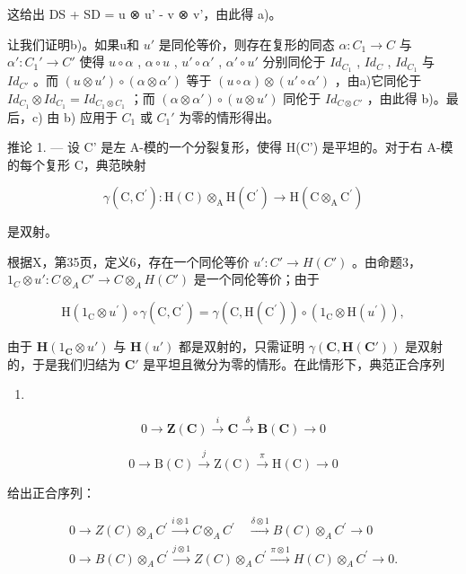 这给出 DS + SD = u ⊗ u' - v ⊗ v'，由此得 a)。

让我们证明b)。如果u和 \(u'\) 是同伦等价，则存在复形的同态 \(\alpha: C_{1} \to C\) 与 \(\alpha': C_{1}' \to C'\) 使得 \(u \circ \alpha\) , \(\alpha \circ u\) , \(u' \circ \alpha'\) , \(\alpha' \circ u'\) 分别同伦于 \(Id_{C_{1}}\) , \(Id_{C}\) , \(Id_{C_{1}}\) 与 \(Id_{C'}\) 。而 \((u \otimes u') \circ (\alpha \otimes \alpha')\) 等于 \((u \circ \alpha) \otimes (u' \circ \alpha')\) ，由a)它同伦于 \(Id_{C_{1}} \otimes Id_{C_{1}} = Id_{C_{1} \otimes C_{1}}\) ；而 \((\alpha \otimes \alpha') \circ (u \otimes u')\) 同伦于 \(Id_{C \otimes C'}\) ，由此得 b)。最后，c) 由 b) 应用于 \(C_{1}\) 或 \(C_{1}'\) 为零的情形得出。

推论 1. --- 设 C' 是左 A-模的一个分裂复形，使得 H(C') 是平坦的。对于右 A-模的每个复形 C，典范映射

\[
\gamma (\mathrm{C}, \mathrm{C} ^ {\prime}): \mathrm{H} (\mathrm{C}) \otimes_ {\mathrm{A}} \mathrm{H} (\mathrm{C} ^ {\prime}) \rightarrow \mathrm{H} (\mathrm{C} \otimes_ {\mathrm{A}} \mathrm{C} ^ {\prime})
\]

是双射。

根据X，第35页，定义6，存在一个同伦等价 \(u': C' \to H(C')\) 。由命题3， \(1_{C} \otimes u': C \otimes_{A} C' \to C \otimes_{A} H(C')\) 是一个同伦等价；由于

\[
\mathrm{H} \left(1 _ {\mathrm{C}} \otimes u ^ {\prime}\right) \circ \gamma (\mathrm{C}, \mathrm{C} ^ {\prime}) = \gamma (\mathrm{C}, \mathrm{H} (\mathrm{C} ^ {\prime})) \circ \left(1 _ {\mathrm{C}} \otimes \mathrm{H} (u ^ {\prime})\right),
\]

由于 \(\mathbf{H}(1_{\mathbf{C}} \otimes u')\) 与 \(\mathbf{H}(u')\) 都是双射的，只需证明 \(\gamma(\mathbf{C}, \mathbf{H}(\mathbf{C}'))\) 是双射的，于是我们归结为 \(\mathbf{C}'\) 是平坦且微分为零的情形。在此情形下，典范正合序列

\begin{enumerate}
\def\labelenumi{(\Roman{enumi})}
\tightlist
\item
\end{enumerate}

\[
0 \to \mathbf {Z} (\mathbf {C}) \xrightarrow {i} \mathbf {C} \xrightarrow {\delta} \mathbf {B} (\mathbf {C}) \to 0\tag{II}
\]

\[
0 \rightarrow \mathrm{B} (\mathrm{C}) \xrightarrow {j} \mathrm{Z} (\mathrm{C}) \xrightarrow {\pi} \mathrm{H} (\mathrm{C}) \rightarrow 0
\]

给出正合序列：

\[
\begin{array}{l} 0 \longrightarrow Z (C) \otimes_ {A} C ^ {\prime} \xrightarrow {i \otimes 1} C \otimes_ {A} C ^ {\prime} \quad \xrightarrow {\delta \otimes 1} B (C) \otimes_ {A} C ^ {\prime} \longrightarrow 0 \\ 0 \longrightarrow B (C) \otimes_ {A} C ^ {\prime} \xrightarrow {j \otimes 1} Z (C) \otimes_ {A} C ^ {\prime} \xrightarrow {\pi \otimes 1} H (C) \otimes_ {A} C ^ {\prime} \longrightarrow 0. \end{array}
\]

